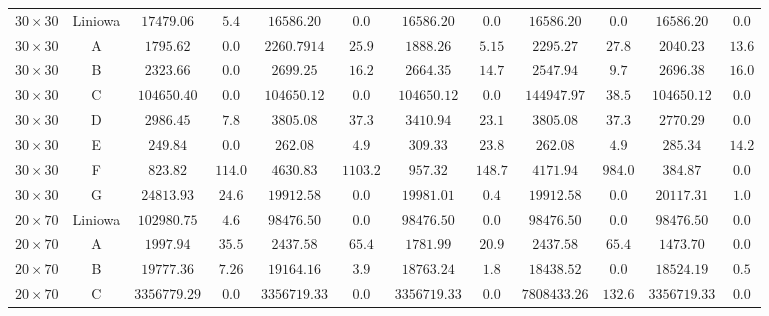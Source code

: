 \begin{table}[h!]
\begin{center}
{\begin{tabular}{c|c|c|c|c|c|c|c|c|c|c|c}
            \hline
            $30 \times 30$ & Liniowa     & $17479.06$ & $5.4$                    & $16586.20$ & $0.0$         & $16586.20$ & $0.0$        & $16586.20$ & $0.0$        & $16586.20$ & $0.0$ \\
            $30 \times 30$ & A           & $1795.62$ & $0.0$                     & $2260.7914$ & $25.9$       & $1888.26$ & $5.15$        & $2295.27$ & $27.8$        & $2040.23$ & $13.6$ \\
            $30 \times 30$ & B           & $2323.66$ & $0.0$                     & $2699.25$ & $16.2$         & $2664.35$ & $14.7$        & $2547.94$ & $9.7$         & $2696.38$ & $16.0$ \\
            $30 \times 30$ & C           & $104650.40$ & $0.0$                   & $104650.12$ & $0.0$        & $104650.12$ & $0.0$       & $144947.97$ & $38.5$      & $104650.12$ & $0.0$ \\
            $30 \times 30$ & D           & $2986.45$ & $7.8$                     & $3805.08$ & $37.3$         & $3410.94$ & $23.1$        & $3805.08$ & $37.3$        & $2770.29$ & $0.0$ \\
            $30 \times 30$ & E           & $249.84$ & $0.0$                      & $262.08$ & $4.9$           & $309.33$ & $23.8$         & $262.08$ & $4.9$          & $285.34$ & $14.2$ \\
            $30 \times 30$ & F           & $823.82$ & $114.0$                    & $4630.83$ & $1103.2$       & $957.32$ & $148.7$        & $4171.94$ & $984.0$       & $384.87$ & $0.0$ \\
            $30 \times 30$ & G           & $24813.93$ & $24.6$                   & $19912.58$ & $0.0$         & $19981.01$ & $0.4$        & $19912.58$ & $0.0$        & $20117.31$ & $1.0$ \\
            \hline
            $20 \times 70$ & Liniowa     & $102980.75$ & $4.6$                   & $98476.50$ & $0.0$         & $98476.50$ & $0.0$        & $98476.50$ & $0.0$        & $98476.50$ & $0.0$ \\
            $20 \times 70$ & A           & $1997.94$ & $35.5$                    & $2437.58$ & $65.4$         & $1781.99$ & $20.9$        & $2437.58$ & $65.4$        & $1473.70$ & $0.0$ \\
            $20 \times 70$ & B           & $19777.36$ & $7.26$                   & $19164.16$ & $3.9$         & $18763.24$ & $1.8$        & $18438.52$ & $0.0$        & $18524.19$ & $0.5$ \\
            $20 \times 70$ & C           & $3356779.29$ & $0.0$                  & $3356719.33$ & $0.0$       & $3356719.33$ & $0.0$      & $7808433.26$ & $132.6$    & $3356719.33$ & $0.0$ \\

\end{tabular}}
\end{center}
\end{table}
